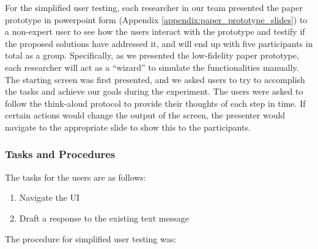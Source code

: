 \documentclass[acmsmall,screen,authorversion,nonacm]{acmart}
\begin{document}
For the simplified user testing, each researcher in our team presented the paper prototype in powerpoint form (Appendix \ref{appendix:paper_prototype_slides}) to a non-expert user to see how the users interact with the prototype and testify if the proposed solutions have addressed it, and will end up with five participants in total as a group. Specifically, as we presented the low-fidelity paper prototype, each researcher will act as a “wizard” to simulate the functionalities manually. The starting screen was first presented, and we asked users to try to accomplish the tasks and achieve our goals during the experiment. The users were asked to follow the think-aloud protocol to provide their thoughts of each step in time. If certain actions would change the output of the screen, the presenter would navigate to the appropriate slide to show this to the participants.

\subsubsection{Tasks and Procedures}

The tasks for the users are as follows:

\begin{enumerate}
    \item Navigate the UI
    \item Draft a response to the existing text message
\end{enumerate}

The procedure for simplified user testing was:
\end{document}
